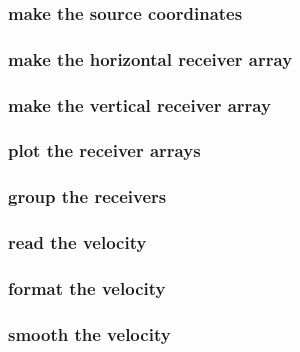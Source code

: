 \begin{frame} \frametitle{make the source coordinates}

\end{frame}
\cwpnote{}

\begin{frame} \frametitle{make the horizontal receiver array}

\end{frame}
\cwpnote{}

\begin{frame} \frametitle{make the vertical receiver array}

\end{frame}
\cwpnote{}

\begin{frame} \frametitle{plot the receiver arrays}

\end{frame}
\cwpnote{}

\begin{frame}  \end{frame}

\begin{frame} \frametitle{group the receivers}

\end{frame}
\cwpnote{}

\begin{frame} \frametitle{read the velocity}

\end{frame}
\cwpnote{}

\begin{frame} \frametitle{format the velocity}

\end{frame}
\cwpnote{}

\begin{frame} \frametitle{smooth the velocity}

\end{frame}
\cwpnote{}

